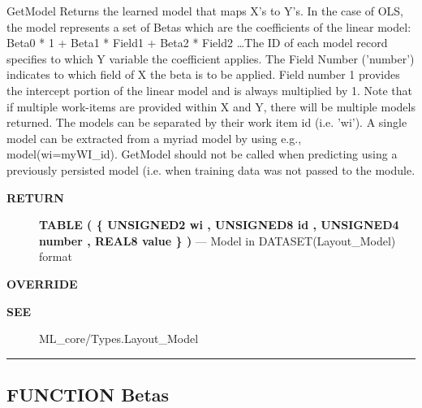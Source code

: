 \par





GetModel Returns the learned model that maps X's to Y's. In the case of OLS, the model represents a set of Betas which are the coefficients of the linear model: Beta0 * 1 + Beta1 * Field1 + Beta2 * Field2 \ldots The ID of each model record specifies to which Y variable the coefficient applies. The Field Number ('number') indicates to which field of X the beta is to be applied. Field number 1 provides the intercept portion of the linear model and is always multiplied by 1. Note that if multiple work-items are provided within X and Y, there will be multiple models returned. The models can be separated by their work item id (i.e. 'wi'). A single model can be extracted from a myriad model by using e.g., model(wi=myWI\_id). GetModel should not be called when predicting using a previously persisted model (i.e. when training data was not passed to the module.








\par
\begin{description}
\item [\colorbox{tagtype}{\color{white} \textbf{\textsf{RETURN}}}] \textbf{TABLE ( \{ UNSIGNED2 wi , UNSIGNED8 id , UNSIGNED4 number , REAL8 value \} )} --- Model in DATASET(Layout\_Model) format
\end{description}






\par
\begin{description}
\item [\colorbox{tagtype}{\color{white} \textbf{\textsf{OVERRIDE}}}] 
\end{description}






\par
\begin{description}
\item [\colorbox{tagtype}{\color{white} \textbf{\textsf{SEE}}}] ML\_core/Types.Layout\_Model
\end{description}



\rule{\linewidth}{0.5pt}
\subsection*{\textsf{\colorbox{headtoc}{\color{white} FUNCTION}
Betas}}

